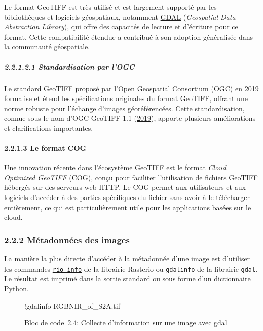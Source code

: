 \documentclass[
]{article}
\newenvironment{Shaded}{}{}
\newcommand{\NormalTok}[1]{#1}
\newcommand{\OperatorTok}[1]{\textcolor[rgb]{0.40,0.40,0.40}{#1}}
\begin{document}
Le format GeoTIFF est très utilisé et est largement supporté par les
bibliothèques et logiciels géospatiaux, notamment
\href{https://gdal.org}{GDAL} (\emph{Geospatial Data Abstraction
Library}), qui offre des capacités de lecture et d'écriture pour ce
format. Cette compatibilité étendue a contribué à son adoption
généralisée dans la communauté géospatiale.

\subparagraph{\texorpdfstring{{2.2.1.2.1} Standardisation par
l'OGC}{2.2.1.2.1 Standardisation par l'OGC}}\label{standardisation-par-logc}

Le standard GeoTIFF proposé par l'Open Geospatial Consortium (OGC) en
2019 formalise et étend les spécifications originales du format GeoTIFF,
offrant une norme robuste pour l'échange d'images géoréférencées. Cette
standardisation, connue sous le nom d'OGC GeoTIFF 1.1
{(\href{references.html\#ref-OGCGeoTIFF}{2019})}, apporte plusieurs
améliorations et clarifications importantes.

\paragraph{\texorpdfstring{{2.2.1.3} Le format
COG}{2.2.1.3 Le format COG}}\label{le-format-cog}

Une innovation récente dans l'écosystème GeoTIFF est le format
\emph{Cloud Optimized GeoTIFF} (\href{http://cogeo.org/}{COG}), conçu
pour faciliter l'utilisation de fichiers GeoTIFF hébergés sur des
serveurs web HTTP. Le COG permet aux utilisateurs et aux logiciels
d'accéder à des parties spécifiques du fichier sans avoir à le
télécharger entièrement, ce qui est particulièrement utile pour les
applications basées sur le cloud.

\subsubsection{\texorpdfstring{{2.2.2} Métadonnées des
images}{2.2.2 Métadonnées des images}}\label{muxe9tadonnuxe9es-des-images}

La manière la plus directe d'accéder à la métadonnée d'une image est
d'utiliser les commandes
\href{https://rasterio.readthedocs.io/en/stable/cli.html\#info}{\texttt{rio\ info}}
de la librairie Rasterio ou \texttt{gdalinfo} de la librairie
\texttt{gdal}. Le résultat est imprimé dans la sortie standard ou sous
forme d'un dictionnaire Python.

\label{c4af2be1}
\label{lst-gdalinfo}
\begin{figure}
\centering
{}\label{lst-gdalinfo}
\begin{Shaded}
\begin{Highlighting}[]
\OperatorTok{!}\NormalTok{gdalinfo RGBNIR\_of\_S2A.tif}
\end{Highlighting}
\end{Shaded}
\caption{Bloc de code~2.4: Collecte d'information sur une image avec
gdal}
\end{figure}
\end{document}
